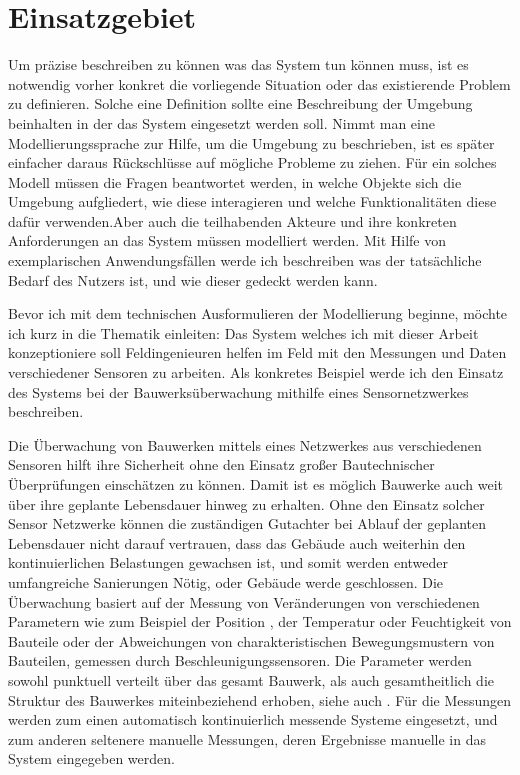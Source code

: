\section{Einsatzgebiet}

Um präzise beschreiben zu können was das System tun können muss, ist es notwendig vorher konkret die vorliegende Situation oder das existierende Problem zu definieren. Solche eine Definition sollte eine Beschreibung der Umgebung beinhalten in der das System eingesetzt werden soll. Nimmt man eine Modellierungssprache zur Hilfe, um die Umgebung zu beschrieben, ist es später einfacher daraus Rückschlüsse auf mögliche Probleme zu ziehen. Für ein solches Modell müssen die Fragen beantwortet werden, in welche Objekte sich die Umgebung aufgliedert, wie diese interagieren und welche Funktionalitäten diese dafür verwenden.Aber auch die teilhabenden Akteure und ihre konkreten Anforderungen an das System müssen modelliert werden. Mit Hilfe von exemplarischen Anwendungsfällen werde ich beschreiben was der tatsächliche Bedarf des Nutzers ist, und wie dieser gedeckt werden kann.

Bevor ich mit dem technischen Ausformulieren der Modellierung beginne, möchte ich kurz in die Thematik einleiten: Das System welches ich mit dieser Arbeit konzeptioniere soll Feldingenieuren helfen im Feld mit den Messungen und Daten verschiedener Sensoren zu arbeiten. Als konkretes Beispiel werde ich den Einsatz des Systems bei der Bauwerksüberwachung mithilfe eines Sensornetzwerkes beschreiben.

Die Überwachung von Bauwerken mittels eines Netzwerkes aus verschiedenen Sensoren hilft ihre Sicherheit ohne den Einsatz großer Bautechnischer Überprüfungen einschätzen zu können. Damit ist es möglich Bauwerke auch weit über ihre geplante Lebensdauer hinweg zu erhalten. Ohne den Einsatz solcher Sensor Netzwerke können die zuständigen Gutachter bei Ablauf der geplanten Lebensdauer nicht darauf vertrauen, dass das Gebäude auch weiterhin den kontinuierlichen Belastungen gewachsen ist, und somit werden entweder umfangreiche Sanierungen Nötig, oder Gebäude werde geschlossen. Die Überwachung basiert auf der Messung von Veränderungen von verschiedenen Parametern wie zum Beispiel der Position , der Temperatur oder Feuchtigkeit von Bauteile oder der Abweichungen von charakteristischen Bewegungsmustern von Bauteilen, gemessen durch Beschleunigungssensoren. Die Parameter werden sowohl punktuell  verteilt über das gesamt Bauwerk, als auch gesamtheitlich die Struktur des Bauwerkes miteinbeziehend erhoben, siehe auch \citep{worden_overview_2004} \citep{farrar_introduction_2007} \citep{boller_structural_2004}. Für die Messungen werden zum einen automatisch kontinuierlich messende Systeme eingesetzt, und zum anderen seltenere manuelle Messungen, deren Ergebnisse manuelle in das System eingegeben werden. 

